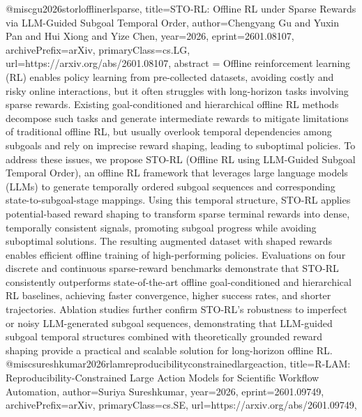 {}@misc{gu2026storlofflinerlsparse,
      title={STO-RL: Offline RL under Sparse Rewards via LLM-Guided Subgoal Temporal Order}, 
      author={Chengyang Gu and Yuxin Pan and Hui Xiong and Yize Chen},
      year={2026},
      eprint={2601.08107},
      archivePrefix={arXiv},
      primaryClass={cs.LG},
      url={https://arxiv.org/abs/2601.08107},
      abstract = {Offline reinforcement learning (RL) enables policy learning from pre-collected datasets, avoiding costly and risky online interactions, but it often struggles with long-horizon tasks involving sparse rewards. Existing goal-conditioned and hierarchical offline RL methods decompose such tasks and generate intermediate rewards to mitigate limitations of traditional offline RL, but usually overlook temporal dependencies among subgoals and rely on imprecise reward shaping, leading to suboptimal policies. To address these issues, we propose STO-RL (Offline RL using LLM-Guided Subgoal Temporal Order), an offline RL framework that leverages large language models (LLMs) to generate temporally ordered subgoal sequences and corresponding state-to-subgoal-stage mappings. Using this temporal structure, STO-RL applies potential-based reward shaping to transform sparse terminal rewards into dense, temporally consistent signals, promoting subgoal progress while avoiding suboptimal solutions. The resulting augmented dataset with shaped rewards enables efficient offline training of high-performing policies. Evaluations on four discrete and continuous sparse-reward benchmarks demonstrate that STO-RL consistently outperforms state-of-the-art offline goal-conditioned and hierarchical RL baselines, achieving faster convergence, higher success rates, and shorter trajectories. Ablation studies further confirm STO-RL's robustness to imperfect or noisy LLM-generated subgoal sequences, demonstrating that LLM-guided subgoal temporal structures combined with theoretically grounded reward shaping provide a practical and scalable solution for long-horizon offline RL.}
}@misc{sureshkumar2026rlamreproducibilityconstrainedlargeaction,
      title={R-LAM: Reproducibility-Constrained Large Action Models for Scientific Workflow Automation}, 
      author={Suriya Sureshkumar},
      year={2026},
      eprint={2601.09749},
      archivePrefix={arXiv},
      primaryClass={cs.SE},
      url={https://arxiv.org/abs/2601.09749},
}
